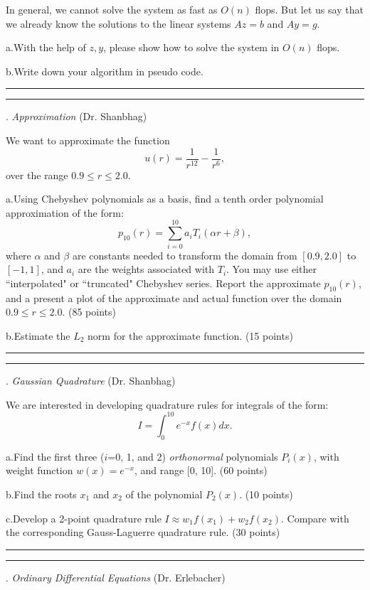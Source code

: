 \documentclass [11point]{article}
\begin{document}
In general, we cannot solve the system as fast as $O(n)$ flops. But let us say that we already know the solutions to the linear systems $Az=b$ and $Ay=g$.\medskip

a.\quad With the help of $z, y$, please show how to solve the system in $O(n)$ flops.\medskip

b.\quad Write down your algorithm in pseudo code.

\bigskip
\hrule 

\pagebreak
\hrule 
{}. \textit{Approximation} (Dr. Shanbhag)
\bigskip

We want to approximate the function $$ u(r) = \frac{1}{r^{12}} - \frac{1}{r^{6}},$$ over the range $0.9 \leq r \leq 2.0$.\medskip

a.\quad Using Chebyshev polynomials as a basis, find a tenth order polynomial approximation of the form: $$p_{10}(r) = \sum_{i=0}^{10} a_i T_i(\alpha r + \beta),$$ where $\alpha$ and $\beta$ are constants needed to transform the domain from $[0.9, 2.0]$ to $[-1, 1]$, and $a_i$ are the weights associated with $T_i$. You may use either ``interpolated" or ``truncated" Chebyshev series. Report the approximate $p_{10}(r)$, and a present a plot of the approximate and actual function over the domain $0.9 \leq r \leq 2.0$. (85 points)\medskip

b.\quad Estimate the $L_{2}$ norm for the approximate function. (15 points)

\bigskip
\hrule 




\pagebreak
\hrule 
{}. \textit{Gaussian Quadrature} (Dr. Shanbhag)
\bigskip

We are interested in developing quadrature rules for integrals of the form: $$ I = \int_0^{10} e^{-x} f(x) dx.$$\medskip

a.\quad Find the first three ($i$=0, 1, and 2) \textit{orthonormal} polynomials $P_i(x)$, with weight function $w(x) = e^{-x}$, and range [0, 10]. (60 points)\medskip

b.\quad Find the roots $x_1$ and $x_2$ of the polynomial $P_2(x)$. (10 points)\medskip

c.\quad Develop a 2-point quadrature rule $I \approx w_1 f(x_1) + w_2 f(x_2)$. Compare with the corresponding Gauss-Laguerre quadrature rule. (30 points) \medskip

\bigskip
\hrule 




\pagebreak
\hrule 
{}. \textit{Ordinary Differential Equations} (Dr. Erlebacher)
\bigskip
\end{document}
